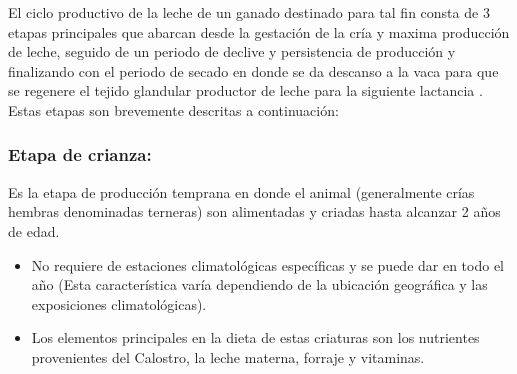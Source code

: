  
El ciclo productivo de la leche de un ganado destinado para tal fin consta de 3 etapas principales que abarcan desde la gestación de la cría y maxima producción de leche, seguido de un periodo de declive y persistencia de producción y finalizando con el periodo de secado en donde se da descanso a la vaca para que se regenere el tejido glandular productor de leche para la siguiente lactancia \cite{mahecha}.\\

Estas etapas son brevemente descritas a continuación:


    \subsubsection{Etapa de crianza:} Es la etapa de producción temprana en donde el animal (generalmente crías hembras denominadas terneras) son alimentadas y criadas hasta alcanzar 2 años de edad.
	\begin{itemize}
		\item No requiere de estaciones climatológicas específicas y se puede dar en todo el año (Esta característica varía dependiendo de la ubicación geográfica y las exposiciones climatológicas).
		\item Los elementos principales en la dieta de estas criaturas son los nutrientes provenientes del Calostro, la leche materna, forraje y vitaminas.\\
	\end{itemize} 
